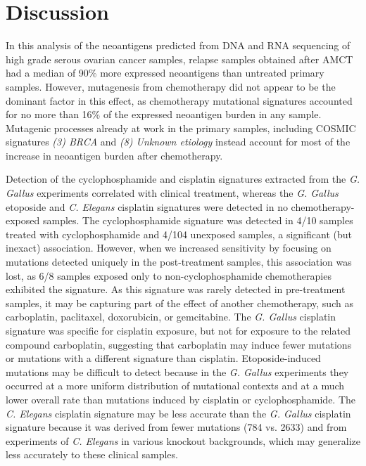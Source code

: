 \section*{Discussion}
In this analysis of the neoantigens predicted from DNA and RNA sequencing of high grade serous ovarian cancer samples, relapse samples obtained after AMCT had a median of 90\% more expressed neoantigens than untreated primary samples. However, mutagenesis from chemotherapy did not appear to be the dominant factor in this effect, as chemotherapy mutational signatures accounted for no more than 16\% of the expressed neoantigen burden in any sample. Mutagenic processes already at work in the primary samples, including COSMIC signatures \textit{(3) BRCA} and \textit{(8) Unknown etiology} instead account for most of the increase in neoantigen burden after chemotherapy.

Detection of the cyclophosphamide and cisplatin signatures extracted from the \textit{G. Gallus} experiments correlated with clinical treatment, whereas the \textit{G. Gallus} etoposide and \textit{C. Elegans} cisplatin signatures were detected in no chemotherapy-exposed samples. The cyclophosphamide signature was detected in 4/10 samples treated with cyclophosphamide and 4/104 unexposed samples, a significant (but inexact) association. However, when we increased sensitivity by focusing on mutations detected uniquely in the post-treatment samples, this association was lost, as 6/8 samples exposed only to non-cyclophosphamide chemotherapies exhibited the signature. As this signature was rarely detected in pre-treatment samples, it may be capturing part of the effect of another chemotherapy, such as carboplatin, paclitaxel, doxorubicin, or gemcitabine. The \textit{G. Gallus} cisplatin signature was specific for cisplatin exposure, but not for exposure to the related compound carboplatin, suggesting that carboplatin may induce fewer mutations or mutations with a different signature than cisplatin. Etoposide-induced mutations may be difficult to detect because in the \textit{G. Gallus} experiments they occurred at a more uniform distribution of mutational contexts and at a much lower overall rate than mutations induced by cisplatin or cyclophosphamide. The \textit{C. Elegans} cisplatin signature may be less accurate than the \textit{G. Gallus} cisplatin signature because it was derived from fewer mutations (784 vs. 2633) and from experiments of \textit{C. Elegans} in various knockout backgrounds, which may generalize less accurately to these clinical samples.

